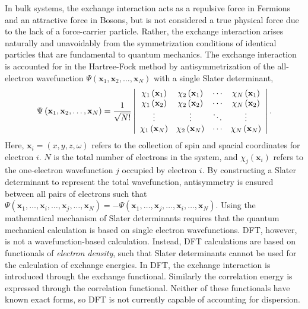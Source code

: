 \documentclass[titlepage,11pt]{article}
\begin{document}
In bulk systems, the exchange interaction acts as a repulsive force in Fermions and an attractive force in Bosons, but is not considered a true physical force due to the lack of a force-carrier particle. Rather, the exchange interaction arises naturally and unavoidably from the symmetrization conditions of identical particles that are fundamental to quantum mechanics. The exchange interaction is accounted for in the Hartree-Fock method by antisymmetrization of the all-electron wavefunction $\Psi \left( \mathbf { x } _ { 1 } , \mathbf { x } _ { 2 } , \ldots , \mathbf { x } _ { N } \right)$ with a single Slater determinant,~\cite{szabo2012modern}
%
\begin{align}
\Psi \left( \mathbf { x } _ { 1 } , \mathbf { x } _ { 2 } , \ldots , \mathbf { x } _ { N } \right) 
= \frac { 1 } { \sqrt { N ! } } 
\left| 
\begin{array} { c c c c } 
{ \chi _ { 1 } \left( \mathbf { x } _ { 1 } \right) } & { \chi _ { 2 } \left( \mathbf { x } _ { 1 } \right) } & { \cdots } & { \chi _ { N } \left( \mathbf { x } _ { 1 } \right) } \\ 
{ \chi _ { 1 } \left( \mathbf { x } _ { 2 } \right) } & { \chi _ { 2 } \left( \mathbf { x } _ { 2 } \right) } & { \cdots } & { \chi _ { N } \left( \mathbf { x } _ { 2 } \right) } \\ 
{ \vdots } & { \vdots } & { \ddots } & { \vdots } \\ 
{ \chi _ { 1 } \left( \mathbf { x } _ { N } \right) } & { \chi _ { 2 } \left( \mathbf { x } _ { N } \right) } & { \cdots } & { \chi _ { N } \left( \mathbf { x } _ { N } \right) } 
\end{array} 
\right|.
\label{eq:SlaterDet}
\end{align}
%
Here, $\mathbf { x }_{ i } = ( x, y, z , \omega)$ refers to the collection of spin and spacial coordinates for electron $i$. $N$ is the total number of electrons in the system, and $\chi_{ j } (\mathbf { x } _ { i })$ refers to the one-electron wavefunction $j$ occupied by electron $i$. By constructing a Slater determinant to represent the total wavefunction, antisymmetry is ensured between all pairs of electrons such that $\Psi \left( \mathbf { x } _ { 1 } , \ldots ,\mathbf { x } _ { i }, \ldots, \mathbf { x } _ { j }, \ldots , \mathbf { x } _ { N } \right) = - \Psi \left( \mathbf { x } _ { 1 } , \ldots ,\mathbf { x } _ { j }, \ldots, \mathbf { x } _ { i }, \ldots , \mathbf { x } _ { N } \right)$. Using the mathematical mechanism of Slater determinants requires that the quantum mechanical calculation is based on single electron wavefunctions. DFT, however, is not a wavefunction-based calculation. Instead, DFT calculations are based on functionals of \textit{electron density}, such that Slater determinants cannot be used for the calculation of exchange energies. In DFT, the exchange interaction is introduced through the exchange functional. Similarly the correlation energy is expressed through the correlation functional. Neither of these functionals have known exact forms, so DFT is not currently capable of accounting for dispersion.
	
\end{document}

